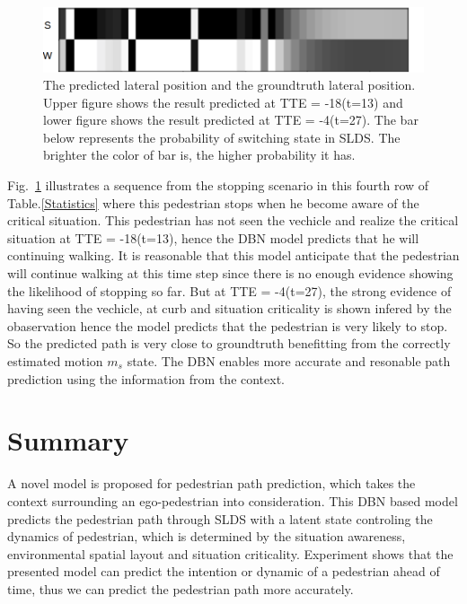 \documentclass[10pt,twocolumn,letterpaper]{article}
\begin{document}
\begin{figure}[t]
\begin{center}
         \end{center}
         \begin{center}
            \includegraphics[width=0.8\linewidth]{images/m_bar_stop.png}
        \end{center}         
        \caption{The predicted lateral position and the groundtruth lateral position. 
        Upper figure shows the result predicted at TTE = -18(t=13) and lower figure shows 
        the result predicted at TTE = -4(t=27). The bar below represents the 
        probability of switching state in SLDS. The brighter the color of bar is, the higher
        probability it has.}
        \label{fig:long}
        \label{fig:onecol}
        \label{lat_pos0}
    \end{figure}
    Fig.~\ref{lat_pos0} illustrates a sequence from the stopping scenario in this fourth 
    row of Table.\ref{Statistics} where this pedestrian stops when he become aware
    of the critical situation. This pedestrian has not seen the vechicle and realize
    the critical situation at TTE = -18(t=13), hence the DBN model predicts that he will 
    continuing walking. It is reasonable that this model anticipate that the pedestrian 
    will continue walking at this time step 
    since there is no enough evidence showing the likelihood of stopping so far.
    But at TTE = -4(t=27), the strong evidence of having seen the vechicle,
    at curb and situation criticality is shown infered by the obaservation 
    hence the model predicts that the pedestrian is very likely to stop. So the predicted path is 
    very close to groundtruth benefitting from the correctly estimated motion $m_s$ state.
    The DBN enables more accurate and resonable path prediction using the information 
    from the context.

    \section{Summary}
    A novel model is proposed for pedestrian path prediction, which takes
    the context surrounding an ego-pedestrian into consideration. This DBN
    based model predicts the pedestrian path through SLDS with a latent 
    state controling the dynamics of pedestrian, which is determined by 
    the situation awareness, environmental spatial 
    layout and situation criticality. Experiment shows that the presented 
    model can predict the intention or dynamic of a pedestrian ahead of time, 
    thus we can predict the pedestrian path more accurately.
\end{document}

